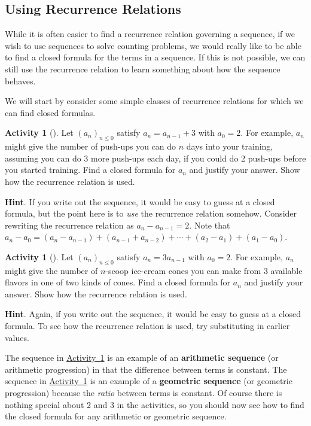 \documentclass[10pt,]{book}
\newcommand{\terminology}[1]{\textbf{#1}}
\theoremstyle{plain}
\theoremstyle{definition}
\theoremstyle{definition}
\theoremstyle{definition}
\newtheorem{activity}[project]{Activity}
\theoremstyle{definition}
\numberwithin{equation}{chapter}
\begin{document}
\subsection[{Using Recurrence Relations}]{Using Recurrence Relations}\label{subsec-recursionclosed}
\hypertarget{p-826}{}%
While it is often easier to find a recurrence relation governing a sequence, if we wish to use sequences to solve counting problems, we would really like to be able to find a closed formula for the terms in a sequence. If this is not possible, we can still use the recurrence relation to learn something about how the sequence behaves.%
\par
\hypertarget{p-827}{}%
We will start by consider some simple classes of recurrence relations for which we can find closed formulas.%
\begin{activity}[]\label{act-arithmetic}
\hypertarget{p-828}{}%
Let \((a_n)_{n \le 0}\) satisfy \(a_n = a_{n-1} + 3\) with \(a_0 = 2\).  For example, \(a_n\) might give the number of push-ups you can do \(n\) days into your training, assuming you can do 3 more push-ups each day, if you could do 2 push-ups before you started training.  Find a closed formula for \(a_n\) and justify your answer.  Show how the recurrence relation is used.%
\par\smallskip%
\noindent\textbf{Hint}.\hypertarget{hint-79}{}\quad%
\hypertarget{p-829}{}%
If you write out the sequence, it would be easy to guess at a closed formula, but the point here is to \emph{use} the recurrence relation somehow.  Consider rewriting the recurrence relation as \(a_n - a_{n-1} = 2\).  Note that \(a_n - a_0 = (a_n - a_{n-1}) + (a_{n-1} + a_{n-2}) + \cdots + (a_2 - a_1) + (a_1 - a_0)\).%
\end{activity}
\begin{activity}[]\label{act-geometric}
\hypertarget{p-830}{}%
Let \((a_n)_{n \le 0}\) satisfy \(a_n = 3a_{n-1}\) with \(a_0 = 2\).  For example, \(a_n\) might give the number of \(n\)-scoop ice-cream cones you can make from 3 available flavors in one of two kinds of cones.  Find a closed formula for \(a_n\) and justify your answer.  Show how the recurrence relation is used.%
\par\smallskip%
\noindent\textbf{Hint}.\hypertarget{hint-80}{}\quad%
\hypertarget{p-831}{}%
Again, if you write out the sequence, it would be easy to guess at a closed formula.  To see how the recurrence relation is used, try substituting in earlier values.%
\end{activity}
\hypertarget{p-832}{}%
The sequence in \hyperref[act-arithmetic]{Activity~\ref{act-arithmetic}} is an example of an \terminology{arithmetic sequence} (or arithmetic progression) in that the difference between terms is constant.  The sequence in \hyperref[act-geometric]{Activity~\ref{act-geometric}} is an example of a \terminology{geometric sequence} (or geometric progression) because the \emph{ratio} between terms is constant.  Of course there is nothing special about 2 and 3 in the activities, so you should now see how to find the closed formula for any arithmetic or geometric sequence.%
\end{document}
